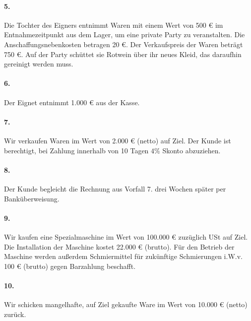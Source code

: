\documentclass[paper=a4, fontsize=11pt]{scrartcl}
\numberwithin{equation}{section}
\numberwithin{figure}{section}
\numberwithin{table}{section}
\begin{document}
{\paragraph{5.}

Die Tochter des Eigners entnimmt Waren mit einem Wert von 500 € im Entnahmezeitpunkt aus dem Lager, um eine private Party zu veranstalten. Die Anschaffungsnebenkosten betragen 20 €.  Der Verkaufspreis der Waren beträgt 750 €. Auf der Party schüttet sie Rotwein über ihr neues Kleid, das daraufhin gereinigt werden muss. \\

\paragraph{6.}

Der Eignet entnimmt 1.000 € aus der Kasse. \\

\paragraph{7.}

Wir verkaufen Waren im Wert von 2.000 € (netto) auf Ziel. Der Kunde ist berechtigt, bei Zahlung innerhalb von 10 Tagen $4 \%$ Skonto abzuziehen. \\

\paragraph{8.}

Der Kunde begleicht die Rechnung aus Vorfall 7. drei Wochen später per Banküberweisung. \\

\paragraph{9.}

Wir kaufen eine Spezialmaschine im Wert von 100.000 € zuzüglich USt auf Ziel. Die Installation der Maschine kostet 22.000 € (brutto). Für den Betrieb der Maschine werden außerdem Schmiermittel für zukünftige Schmierungen i.W.v. 100 € (brutto) gegen Barzahlung beschafft. \\

\paragraph{10.}

Wir schicken mangelhafte, auf Ziel gekaufte Ware im Wert von 10.000 € (netto) zurück. \\

}
\end{document}
